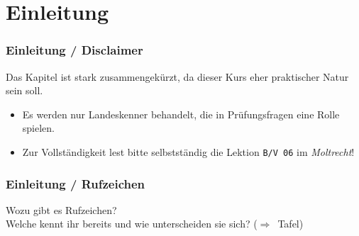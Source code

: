 

\subtitle{Betriebstechnik/Vorschriften 06: \\
  Rufzeichen - Landeskenner \\[2em]}
\date{Stand 18.09.2017}



\section{Einleitung}

\begin{frame}
  \frametitle{Einleitung / Disclaimer}

  \begin{center}
    \Large{Das Kapitel ist stark zusammengekürzt, da dieser Kurs eher
    praktischer Natur sein soll.}
  \end{center}

  \normalsize

  \begin{itemize}
    \item Es werden nur Landeskenner behandelt, die in Prüfungsfragen eine Rolle spielen.
    \item Zur Vollständigkeit lest bitte selbstständig die Lektion
      \texttt{B/V 06} im \emph{Moltrecht}!
  \end{itemize}

\end{frame}


\begin{frame}
  \frametitle{Einleitung / Rufzeichen}

  \begin{center}
    \Large{Wozu gibt es Rufzeichen?} \\[1em]
    \Large{Welche kennt ihr bereits und wie unterscheiden sie sich? ($\Rightarrow$~Tafel)}
  \end{center}

\end{frame}

